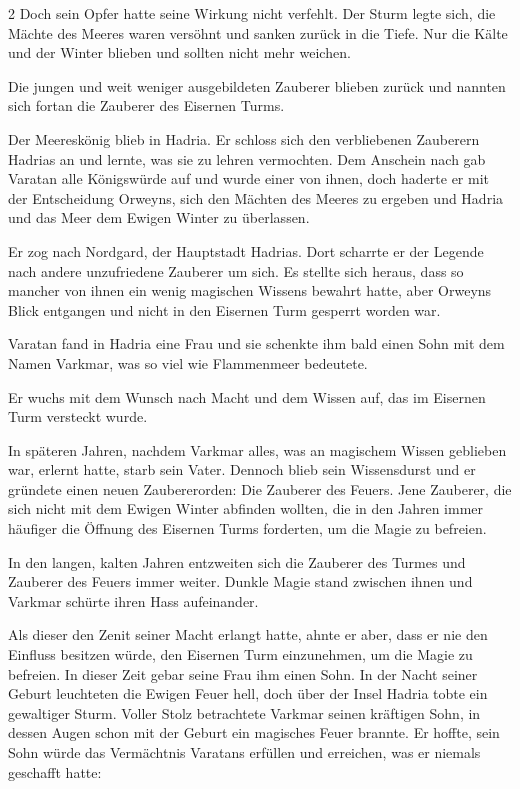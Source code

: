 \documentclass[10pt, a4paper, oneside]{book}
\begin{document}
\begin{multicols}{2}
Doch sein Opfer hatte seine Wirkung nicht verfehlt. Der Sturm legte sich, die Mächte des Meeres waren versöhnt und sanken zurück in die Tiefe. Nur die Kälte und der Winter blieben und sollten nicht mehr weichen.\bigskip

Die jungen und weit weniger ausgebildeten Zauberer blieben zurück und nannten sich fortan die Zauberer des Eisernen Turms.\bigskip

Der Meereskönig blieb in Hadria. Er schloss sich den verbliebenen Zauberern Hadrias an und lernte, was sie zu lehren vermochten. Dem Anschein nach gab Varatan alle Königswürde auf und wurde einer von ihnen, doch haderte er mit der Entscheidung Orweyns, sich den Mächten des Meeres zu ergeben und Hadria und das Meer dem Ewigen Winter zu überlassen.\bigskip

Er zog nach Nordgard, der Hauptstadt Hadrias. Dort scharrte er der Legende nach andere unzufriedene Zauberer um sich. Es stellte sich heraus, dass so mancher von ihnen ein wenig magischen Wissens bewahrt hatte, aber Orweyns Blick entgangen  und nicht in den Eisernen Turm gesperrt worden war.\bigskip

Varatan fand in Hadria eine Frau und sie schenkte ihm bald einen Sohn mit dem Namen Varkmar, was so viel wie Flammenmeer bedeutete.\bigskip

Er wuchs mit dem Wunsch nach Macht und dem Wissen auf, das im Eisernen Turm versteckt wurde.\bigskip

In späteren Jahren, nachdem Varkmar alles, was an magischem Wissen geblieben war, erlernt hatte, starb sein Vater. Dennoch blieb sein Wissensdurst und er gründete einen neuen Zaubererorden: Die Zauberer des Feuers. Jene Zauberer, die sich nicht mit dem Ewigen Winter abfinden wollten, die in den Jahren immer häufiger die Öffnung des Eisernen Turms forderten, um die Magie zu befreien.\bigskip

In den langen, kalten Jahren entzweiten sich die Zauberer des Turmes und Zauberer des Feuers immer weiter. Dunkle Magie stand zwischen ihnen und Varkmar schürte ihren Hass aufeinander.\bigskip

Als dieser den Zenit seiner Macht erlangt hatte, ahnte er aber, dass er nie den Einfluss besitzen würde, den Eisernen Turm einzunehmen, um die Magie zu befreien. In dieser Zeit gebar seine Frau ihm einen Sohn. In der Nacht seiner Geburt leuchteten die Ewigen Feuer hell, doch über der Insel Hadria tobte ein gewaltiger Sturm. Voller Stolz betrachtete Varkmar seinen kräftigen Sohn, in dessen Augen schon mit der Geburt ein magisches Feuer brannte. Er hoffte, sein Sohn würde das Vermächtnis Varatans erfüllen und  erreichen, was er niemals geschafft hatte:\bigskip


\end{multicols}
\end{document}
